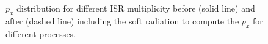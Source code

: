 \begin{figure}[htbp]
   \centering
    \\
    \\
   \begin{tcolorbox}[colback=black!5!white,colframe=white!75!black]
   \caption{$p_x$ distribution for different ISR multiplicity before (solid line) and after (dashed line) including the soft radiation to compute the $p_x$ for different processes.}
   \label{fig:Adx4:HH:MET}
   \end{tcolorbox}
   
\end{figure}